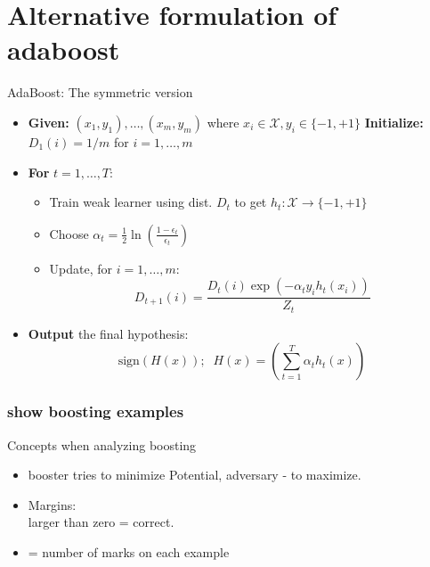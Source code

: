 \documentclass{beamer}
\begin{document}
\section{Alternative formulation of adaboost}
\begin{frame}{AdaBoost: The symmetric version}
\begin{itemize}
\item \textbf{Given:} $(x_1, y_1), \ldots, (x_m, y_m)$ where $x_i \in \mathcal{X}, y_i \in \{-1,+1\}$  \textbf{Initialize:} $D_1(i) = 1/m$ for $i = 1,\ldots,m$
\item \textbf{For} $t = 1,\ldots,T$:
  \begin{itemize}
    \item Train weak learner using dist. $D_t$ to get $h_t: \mathcal{X} \to \{-1,+1\}$
    \item Choose $\alpha_t = \frac{1}{2}\ln\left(\frac{1-\epsilon_t}{\epsilon_t}\right)$
    \item Update, for $i = 1,\ldots,m$:
        \[ D_{t+1}(i) = \frac{D_t(i)\exp(-\alpha_t y_i h_t(x_i))}{Z_t} \]
      \end{itemize}
\item \textbf{Output} the final hypothesis:
    \[ \text{sign}(H(x));\;\; H(x) = \left(\sum_{t=1}^T \alpha_t h_t(x)\right) \]
  \end{itemize}
\end{frame}
\begin{frame}
  \frametitle{show boosting examples}
  
\end{frame}
\begin{frame}{Concepts when analyzing boosting}
  \begin{itemize}
  \item booster tries to minimize Potential, adversary - to maximize.
  \item {}  Margins:\\
      larger than zero = correct.
   \item {} = number of marks on each example
     \begin{small}
       \R{\[
           \Phi(x_1,\ldots,x_n) = \sum_j \beta^i_{r(x_j)}
         \]
         \[
       \beta^i_r = \sum_{j=0}^{\lfloor k/2 \rfloor-r} \binom{k-i}{j}\left(\frac{1}{2}+\gamma\right)^j\left(\frac{1}{2}-\gamma\right)^{k-1-j}
     \]}
 \end{small}
\end{itemize}
\end{frame}
\end{document}
